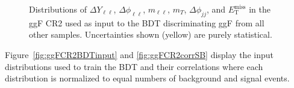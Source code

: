 \begin{figure}[!h]
  \hfill
{\caption{Distributions of $\Delta Y_{\ell\ell}$, $\Delta \phi_{\ell\ell}$, $m_{\ell\ell}$, $m_T$, $\Delta \phi_{jj}$, and $\ensuremath{E_{\text{T}}^{\text{miss}}}$ in the ggF CR2 used as input to the BDT discriminating ggF from all other samples. Uncertainties shown (yellow) are purely statistical.
\label{fig:ggFCR2}}}
\end{figure} 

Figure~\ref{fig:ggFCR2BDTinput} and \ref{fig:ggFCR2corrSB} display the input distributions used to train the BDT and their correlations where each distribution is normalized to equal numbers of background and signal events.

